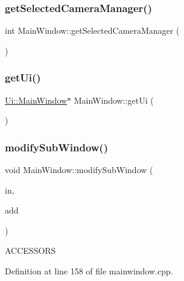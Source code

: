 \mbox{\label{class_main_window_adc95f98d2a718dff996a70851f4739f4}} 
\subsubsection{\texorpdfstring{getSelectedCameraManager()}{getSelectedCameraManager()}}
{\footnotesize\ttfamily int Main\+Window\+::get\+Selected\+Camera\+Manager (\begin{DoxyParamCaption}{ }\end{DoxyParamCaption})}

\mbox{\label{class_main_window_a7dede2dbcc623cec02de056df521e96b}} 
\subsubsection{\texorpdfstring{getUi()}{getUi()}}
{\footnotesize\ttfamily \mbox{\hyperlink{class_ui_1_1_main_window}{Ui\+::\+Main\+Window}}$\ast$ Main\+Window\+::get\+Ui (\begin{DoxyParamCaption}{ }\end{DoxyParamCaption})}

\mbox{\label{class_main_window_aa1aedeaf20f2f0b571a7bd655e3e819e}} 
\subsubsection{\texorpdfstring{modifySubWindow()}{modifySubWindow()}}
{\footnotesize\ttfamily void Main\+Window\+::modify\+Sub\+Window (\begin{DoxyParamCaption}\item[{Q\+Mdi\+Sub\+Window $\ast$}]{in,  }\item[{bool}]{add }\end{DoxyParamCaption})}

A\+C\+C\+E\+S\+S\+O\+RS 

Definition at line 158 of file mainwindow.\+cpp.

\mbox{\label{class_main_window_a16f8da8df766a6b3fb2be1a93d6a3a49}} 
